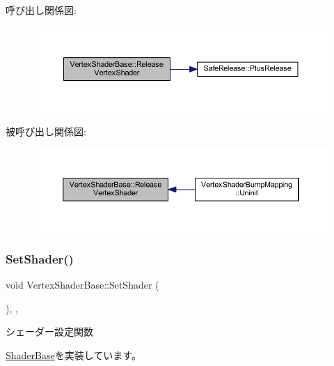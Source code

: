 呼び出し関係図\+:\nopagebreak
\begin{figure}[H]
\begin{center}
\leavevmode
\includegraphics[width=350pt]{class_vertex_shader_base_a42ff1e32a2c231f77d0ba0e6a8312e63_cgraph}
\end{center}
\end{figure}
被呼び出し関係図\+:\nopagebreak
\begin{figure}[H]
\begin{center}
\leavevmode
\includegraphics[width=350pt]{class_vertex_shader_base_a42ff1e32a2c231f77d0ba0e6a8312e63_icgraph}
\end{center}
\end{figure}
\mbox{\label{class_vertex_shader_base_a9f93697c5668852850f0a7b7ef7cb67f}} 
\subsubsection{\texorpdfstring{Set\+Shader()}{SetShader()}}
{\footnotesize\ttfamily void Vertex\+Shader\+Base\+::\+Set\+Shader (\begin{DoxyParamCaption}{ }\end{DoxyParamCaption})\hspace{0.3cm}{\ttfamily [inline]}, {\ttfamily [override]}, {\ttfamily [virtual]}}



シェーダー設定関数 



\mbox{\hyperlink{class_shader_base_af45063254b80602db8626360d643baee}{Shader\+Base}}を実装しています。



